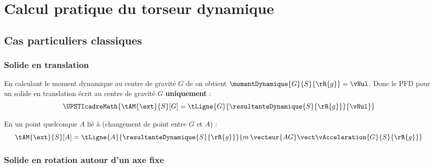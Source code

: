 \documentclass[12pt]{article}
\begin{document}

\section{Calcul pratique du torseur dynamique}

\subsection{Cas particuliers classiques}

\subsubsection{Solide en translation}

En calculant le moment dynamique au centre de gravité $G$ de  on obtient $\momentDynamique{G}{S}{\rR{g}}=\vNul$. Donc le PFD pour un solide en translation écrit au centre de gravité $G$ \textbf{uniquement} : 
\[ \UPSTIcadreMath{\tAM{\ext}{S}[G]=\tLigne{G}{\resultanteDynamique{S}{\rR{g}}}{\vNul}} \] 
 
En un point quelconque $A$ lié à  (changement de point entre $G$ et $A$) :
\[ \tAM{\ext}{S}[A]=\tLigne{A}{\resultanteDynamique{S}{\rR{g}}}{m\,\vecteur{AG}\vect\vAcceleration{G}{S}{\rR{g}}}\] 

\vspace{1em}
\subsubsection{Solide en rotation autour d'un axe fixe \texorpdfstring{}{(O,z)}}
\end{document}
